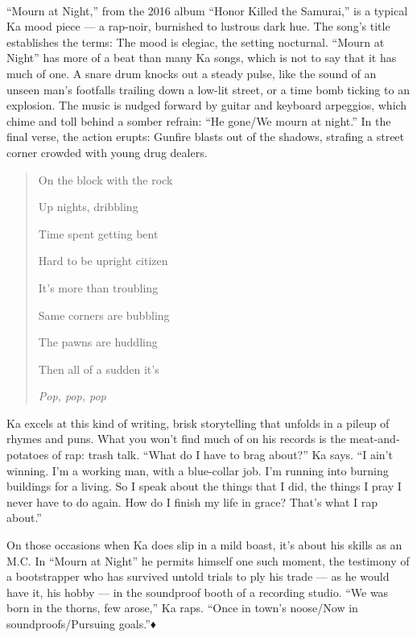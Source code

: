 \hypertarget{-5}{%
\paragraph{}\label{-5}}

``Mourn at Night,'' from the 2016 album ``Honor Killed the Samurai,'' is
a typical Ka mood piece --- a rap-noir, burnished to lustrous dark hue.
The song's title establishes the terms: The mood is elegiac, the setting
nocturnal. ``Mourn at Night'' has more of a beat than many Ka songs,
which is not to say that it has much of one. A snare drum knocks out a
steady pulse, like the sound of an unseen man's footfalls trailing down
a low-lit street, or a time bomb ticking to an explosion. The music is
nudged forward by guitar and keyboard arpeggios, which chime and toll
behind a somber refrain: ``He gone/We mourn at night.'' In the final
verse, the action erupts: Gunfire blasts out of the shadows, strafing a
street corner crowded with young drug dealers.

\begin{quote}
On the block with the rock

Up nights, dribbling

Time spent getting bent

Hard to be upright citizen

It's more than troubling

Same corners are bubbling

The pawns are huddling

Then all of a sudden it's

\emph{Pop, pop, pop}
\end{quote}

Ka excels at this kind of writing, brisk storytelling that unfolds in a
pileup of rhymes and puns. What you won't find much of on his records is
the meat-and-potatoes of rap: trash talk. ``What do I have to brag
about?'' Ka says. ``I ain't winning. I'm a working man, with a
blue-collar job. I'm running into burning buildings for a living. So I
speak about the things that I did, the things I pray I never have to do
again. How do I finish my life in grace? That's what I rap about.''

On those occasions when Ka does slip in a mild boast, it's about his
skills as an M.C. In ``Mourn at Night'' he permits himself one such
moment, the testimony of a bootstrapper who has survived untold trials
to ply his trade --- as he would have it, his hobby --- in the
soundproof booth of a recording studio. ``We was born in the thorns, few
arose,'' Ka raps. ``Once in town's noose/Now in soundproofs/Pursuing
goals.''♦

